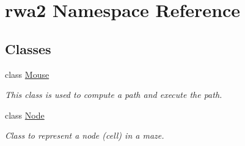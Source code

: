 \hypertarget{namespacerwa2}{}\section{rwa2 Namespace Reference}
\label{namespacerwa2}
\subsection*{Classes}
\begin{DoxyCompactItemize}
\item 
class \hyperlink{classrwa2_1_1_mouse}{Mouse}
\begin{DoxyCompactList}\small\item\em This class is used to compute a path and execute the path. \end{DoxyCompactList}\item 
class \hyperlink{classrwa2_1_1_node}{Node}
\begin{DoxyCompactList}\small\item\em Class to represent a node (cell) in a maze. \end{DoxyCompactList}\end{DoxyCompactItemize}
